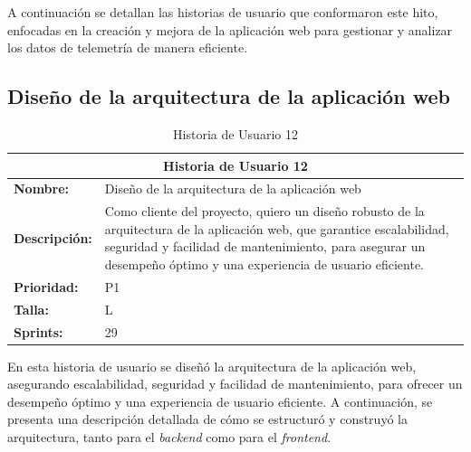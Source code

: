 A continuación se detallan las historias de usuario que conformaron este hito, enfocadas en la creación y mejora de la aplicación web para gestionar y analizar los datos de telemetría de manera eficiente.

\subsection{Diseño de la arquitectura de la aplicación web}
\begin{table}[H]
\centering
\begin{tabular}{|l|p{10cm}|}
\hline
\multicolumn{2}{|c|}{\textbf{Historia de Usuario 12}} \\ \hline
\textbf{Nombre:} & Diseño de la arquitectura de la aplicación web \\ \hline
\textbf{Descripción:} & Como cliente del proyecto, quiero un diseño robusto de la arquitectura de la aplicación web, que garantice escalabilidad, seguridad y facilidad de mantenimiento, para asegurar un desempeño óptimo y una experiencia de usuario eficiente. \\ \hline
\textbf{Prioridad:} & P1 \\ \hline
\textbf{Talla:} & L \\ \hline
\textbf{Sprints:} & 29 \\ \hline
\end{tabular}
\caption{Historia de Usuario 12}
\label{tab:diseno_arquitectura_web}
\end{table}

En esta historia de usuario se diseñó la arquitectura de la aplicación web, asegurando escalabilidad, seguridad y facilidad de mantenimiento, para ofrecer un desempeño óptimo y una experiencia de usuario eficiente. A continuación, se presenta una descripción detallada de cómo se estructuró y construyó la arquitectura, tanto para el \textit{backend} como para el \textit{frontend}.

